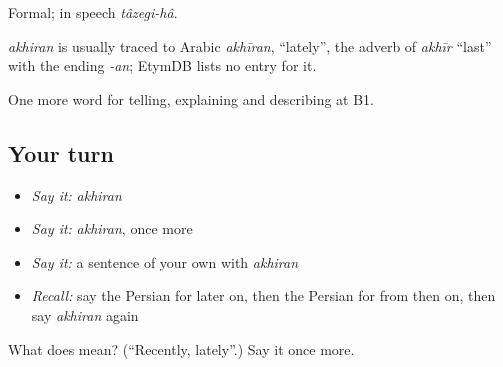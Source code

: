Formal; in speech \emph{tâzegi-hâ}.

\begin{cousinweb}
\emph{akhiran} is usually traced to Arabic \emph{akhīran}, \textquotedblleft{}lately\textquotedblright{}, the adverb of \emph{akhīr} \textquotedblleft{}last\textquotedblright{} with the ending \emph{-an}; EtymDB lists no entry for it.
\end{cousinweb}

\begin{grammarlens}[title={What you've built}]
One more word for telling, explaining and describing at B1.
\end{grammarlens}

\subsection*{Your turn}
\begin{itemize}
\raggedright
  \item \emph{Say it:} \emph{akhiran}
  \item \emph{Say it:} \emph{akhiran}, once more
  \item \emph{Say it:} a sentence of your own with \emph{akhiran}
  \item \emph{Recall:} say the Persian for later on, then the Persian for from then on, then say \emph{akhiran} again
\end{itemize}

\begin{tcolorbox}[breakable,colback=teal!4,colframe=teal!35!black,title={Before you move on}]
What does  mean? (\textquotedblleft{}Recently, lately\textquotedblright{}.) Say it once more.
\end{tcolorbox}
